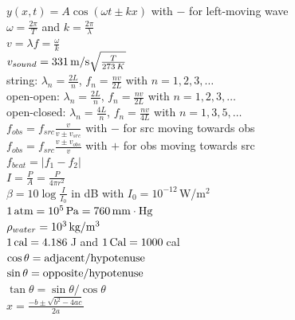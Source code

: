\documentclass[letterpaper,addpoints,answers]{exam}
\begin{document}
\begin{multicols}{2}
 $y(x,t) = A \cos (\omega t \pm k x)$ with $-$ for left-moving wave \\
 $\omega = \frac{2 \pi}{T}$ and $k = \frac{2 \pi}{\lambda}$ \\
 $v = \lambda f = \frac{\omega}{k}$ \\
 $v_{sound} = 331\,\hbox{m/s} \sqrt{\frac{T}{273\,K}}$ \\
 string: $\lambda_n = \frac{2 L}{n}$, $f_n = \frac{n v}{2 L}$ with $n = 1,2,3,\ldots$ \\
 open-open: $\lambda_n = \frac{2 L}{n}$, $f_n = \frac{n v}{2 L}$ with $n = 1,2,3,\ldots$ \\
 open-closed: $\lambda_n = \frac{4 L}{n}$, $f_n = \frac{n v}{4 L}$ with $n = 1,3,5,\ldots$ \\
 $f_{obs} = f_{src} \frac{v}{v \pm v_{src}}$ with $-$ for src moving towards obs \\
 $f_{obs} = f_{src} \frac{v \pm v_{obs}}{v}$ with $+$ for obs moving towards src \\
 $f_{beat} = |f_1 - f_2|$ \\
 $I = \frac{P}{A} = \frac{P}{4 \pi r^2}$ \\
 $\beta = 10 \log \frac{I}{I_0}$ in dB with $I_0 = 10^{-12}$\,W/m$^2$\\
 $1\,\hbox{atm} = 10^5\,\hbox{Pa} = 760\,\hbox{mm}\cdot\hbox{Hg}$ \\
 $\rho_{water} = 10^3\,\hbox{kg}/\hbox{m}^3$ \\
 $1\,\hbox{cal} = 4.186$\,J and $1\,\hbox{Cal} = 1000$\,cal \\ 
 $\cos\theta = \hbox{adjacent}/\hbox{hypotenuse}$ \\
 $\sin\theta = \hbox{opposite}/\hbox{hypotenuse}$ \\
 $\tan\theta = \sin\theta / \cos\theta$ \\
 $x = \frac{-b \pm \sqrt{b^2 - 4 a c}}{2 a}$ \\

 \end{multicols}
\end{document}

